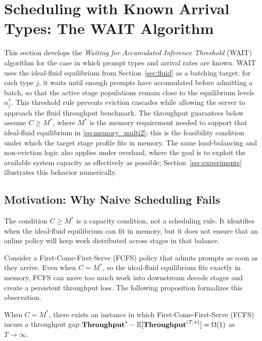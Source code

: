 \section{Scheduling with Known Arrival Types: The WAIT Algorithm}
\label{sec:wait}

This section develops the \textit{Waiting for Accumulated Inference Threshold} (WAIT) algorithm for the case in which prompt types and arrival rates are known. WAIT uses the ideal-fluid equilibrium from Section~\ref{sec:fluid} as a batching target: for each type \(j\), it waits until enough prompts have accumulated before admitting a batch, so that the active stage populations remain close to the equilibrium levels \(n_j^*\). This threshold rule prevents eviction cascades while allowing the server to approach the fluid throughput benchmark. The throughput guarantees below assume \(C \ge M^*\), where \(M^*\) is the memory requirement needed to support that ideal-fluid equilibrium in \eqref{eq:memory_multi2}; this is the feasibility condition under which the target stage profile fits in memory. The same load-balancing and non-eviction logic also applies under overload, where the goal is to exploit the available system capacity as effectively as possible; Section~\ref{sec:experiments} illustrates this behavior numerically.

\subsection{Motivation: Why Naive Scheduling Fails}
\label{subsec:wait_motivation}

The condition \(C\ge M^*\) is a capacity condition, not a scheduling rule. It identifies when the ideal-fluid equilibrium can fit in memory, but it does not ensure that an online policy will keep work distributed across stages in that balance.

Consider a First-Come-First-Serve (FCFS) policy that admits prompts as soon as they arrive. Even when \(C=M^*\), so the ideal-fluid equilibrium fits exactly in memory, FCFS can move too much work into downstream decode stages and create a persistent throughput loss. The following proposition formalizes this observation.

\begin{proposition}\label{prop:lower_bound_FCFS}
When \(C=M^*\), there exists an instance in which First-Come-First-Serve (FCFS) incurs a throughput gap \(\textbf{Throughput}^* - \mathbb{E}[\textbf{Throughput}^{(T,\pi)}] = \Omega(1)\) as \(T \to \infty\).
\end{proposition}

